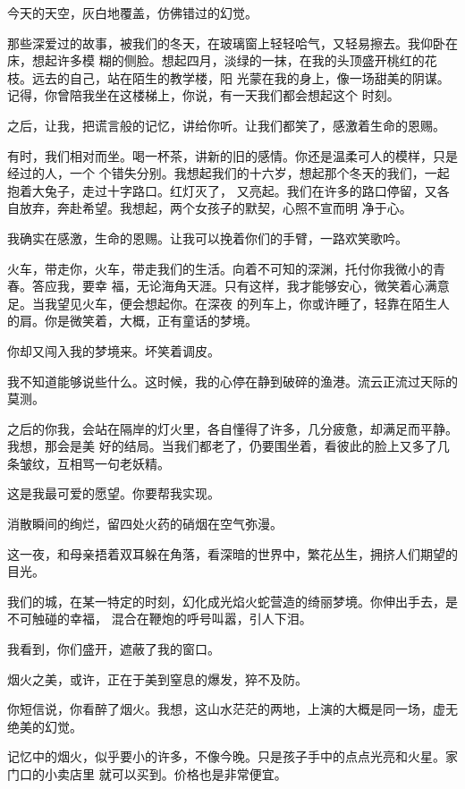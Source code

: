 		今天的天空，灰白地覆盖，仿佛错过的幻觉。

		那些深爱过的故事，被我们的冬天，在玻璃窗上轻轻哈气，又轻易擦去。我仰卧在床，想起许多模
	糊的侧脸。想起四月，淡绿的一抹，在我的头顶盛开桃红的花枝。远去的自己，站在陌生的教学楼，阳
	光蒙在我的身上，像一场甜美的阴谋。记得，你曾陪我坐在这楼梯上，你说，有一天我们都会想起这个
	时刻。


		之后，让我，把谎言般的记忆，讲给你听。让我们都笑了，感激着生命的恩赐。

		有时，我们相对而坐。喝一杯茶，讲新的旧的感情。你还是温柔可人的模样，只是经过的人，一个
	个错失分别。我想起我们的十六岁，想起那个冬天的我们，一起抱着大兔子，走过十字路口。红灯灭了，
	又亮起。我们在许多的路口停留，又各自放弃，奔赴希望。我想起，两个女孩子的默契，心照不宣而明
	净于心。

		我确实在感激，生命的恩赐。让我可以挽着你们的手臂，一路欢笑歌吟。

		火车，带走你，火车，带走我们的生活。向着不可知的深渊，托付你我微小的青春。答应我，要幸
	福，无论海角天涯。只有这样，我才能够安心，微笑着心满意足。当我望见火车，便会想起你。在深夜
	的列车上，你或许睡了，轻靠在陌生人的肩。你是微笑着，大概，正有童话的梦境。

		你却又闯入我的梦境来。坏笑着调皮。

		我不知道能够说些什么。这时候，我的心停在静到破碎的渔港。流云正流过天际的莫测。

		之后的你我，会站在隔岸的灯火里，各自懂得了许多，几分疲惫，却满足而平静。我想，那会是美
	好的结局。当我们都老了，仍要围坐着，看彼此的脸上又多了几条皱纹，互相骂一句老妖精。

		这是我最可爱的愿望。你要帮我实现。

	\endwriting



		消散瞬间的绚烂，留四处火药的硝烟在空气弥漫。

		这一夜，和母亲捂着双耳躲在角落，看深暗的世界中，繁花丛生，拥挤人们期望的目光。

		我们的城，在某一特定的时刻，幻化成光焰火蛇营造的绮丽梦境。你伸出手去，是不可触碰的幸福，
	混合在鞭炮的呼号叫嚣，引人下泪。

		我看到，你们盛开，遮蔽了我的窗口。\par
		烟火之美，或许，正在于美到窒息的爆发，猝不及防。\par
		你短信说，你看醉了烟火。我想，这山水茫茫的两地，上演的大概是同一场，虚无绝美的幻觉。

		记忆中的烟火，似乎要小的许多，不像今晚。只是孩子手中的点点光亮和火星。家门口的小卖店里
	就可以买到。价格也是非常便宜。

